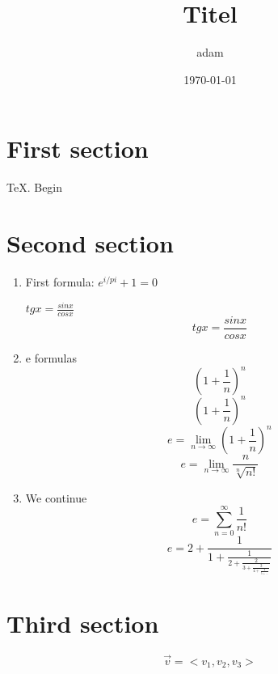 \documentclass{article}
\title{Titel}
\author{adam}
\date{\today}
\begin{document}
\maketitle


\section{First section}

TeX. Begin

    
\section{Second section}

\begin{enumerate} %

\item First formula: 
$ e^{i/pi} + 1 = 0 $

$ tg x = \frac{sin x}{cos x} $
$$ tg x = \frac{sin x}{cos x} $$

\item e formulas
$$ (1 + \frac{1}{n})^n $$
$$ \left(1 + \frac{1}{n}\right)^n$$
$$ e = \lim_{n\to\infty} \left(1 + \frac{1}{n}\right)^n$$
$$ e = \lim_{n\to\infty} \frac{n}{\sqrt[n]{n!}} $$

\item We continue
$$ e = \sum_{n=0}^{\infty} \frac{1}{n!} $$
$$ e = 2 + \frac{1}{1 + \frac{1}{2 + \frac{2}{3 + \frac{3}{4 + \frac{4}{5 + ...}}}}} $$

\end{enumerate}


\section{Third section}

$$ \vec{v} = <v_1, v_2, v_3> $$
\end{document}
